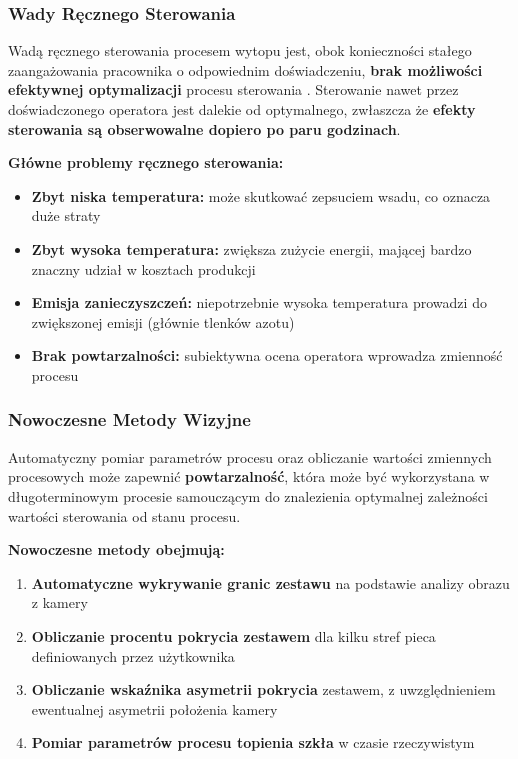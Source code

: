 \documentclass[12pt,a4paper]{article}
\begin{document}
\subsubsection{Wady Ręcznego Sterowania}

Wadą ręcznego sterowania procesem wytopu jest, obok konieczności stałego zaangażowania pracownika o odpowiednim doświadczeniu, \textbf{brak możliwości efektywnej optymalizacji} procesu sterowania \cite{swiat-szkla-monitoring}. Sterowanie nawet przez doświadczonego operatora jest dalekie od optymalnego, zwłaszcza że \textbf{efekty sterowania są obserwowalne dopiero po paru godzinach}.

\textbf{Główne problemy ręcznego sterowania:}
\begin{itemize}
    \item \textbf{Zbyt niska temperatura:} może skutkować zepsuciem wsadu, co oznacza duże straty
    \item \textbf{Zbyt wysoka temperatura:} zwiększa zużycie energii, mającej bardzo znaczny udział w kosztach produkcji
    \item \textbf{Emisja zanieczyszczeń:} niepotrzebnie wysoka temperatura prowadzi do zwiększonej emisji (głównie tlenków azotu)
    \item \textbf{Brak powtarzalności:} subiektywna ocena operatora wprowadza zmienność procesu
\end{itemize}

\subsubsection{Nowoczesne Metody Wizyjne}

Automatyczny pomiar parametrów procesu oraz obliczanie wartości zmiennych procesowych może zapewnić \textbf{powtarzalność}, która może być wykorzystana w długoterminowym procesie samouczącym do znalezienia optymalnej zależności wartości sterowania od stanu procesu.

\textbf{Nowoczesne metody obejmują:}
\begin{enumerate}
    \item \textbf{Automatyczne wykrywanie granic zestawu} na podstawie analizy obrazu z kamery
    \item \textbf{Obliczanie procentu pokrycia zestawem} dla kilku stref pieca definiowanych przez użytkownika
    \item \textbf{Obliczanie wskaźnika asymetrii pokrycia} zestawem, z uwzględnieniem ewentualnej asymetrii położenia kamery
    \item \textbf{Pomiar parametrów procesu topienia szkła} w czasie rzeczywistym
\end{enumerate}
\end{document}
